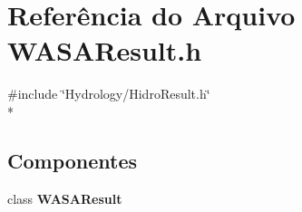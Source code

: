 \section{Referência do Arquivo W\+A\+S\+A\+Result.\+h}
\label{_w_a_s_a_result_8h}
{\ttfamily \#include \char`\"{}Hydrology/\+Hidro\+Result.\+h\char`\"{}}\\*
\subsection*{Componentes}
\begin{DoxyCompactItemize}
\item 
class {\bf W\+A\+S\+A\+Result}
\end{DoxyCompactItemize}
